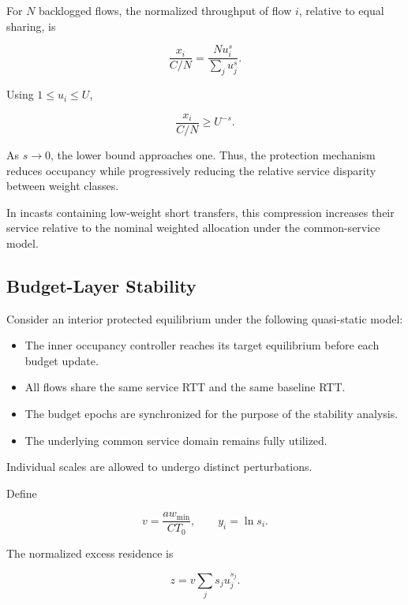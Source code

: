 For \(N\) backlogged flows, the normalized throughput of flow \(i\), relative to equal sharing, is

\begin{equation}
\label{eq:app-f-32}
\frac{x_i}{C/N}
=
\frac{Nu_i^s}{\sum_ju_j^s}.
\end{equation}

Using \(1\le u_i\le U\),

\begin{equation}
\label{eq:app-f-33}
\boxed{
\frac{x_i}{C/N}\ge U^{-s}.
}
\end{equation}

As \(s\to0\), the lower bound approaches one. Thus, the protection mechanism reduces occupancy while progressively reducing the relative service disparity between weight classes.

In incasts containing low-weight short transfers, this compression increases their service relative to the nominal weighted allocation under the common-service model.

\subsection{Budget-Layer Stability}
\label{app:f-5}

Consider an interior protected equilibrium under the following quasi-static model:

\begin{itemize}
\item The inner occupancy controller reaches its target equilibrium before each budget update.
\item All flows share the same service RTT and the same baseline RTT.
\item The budget epochs are synchronized for the purpose of the stability analysis.
\item The underlying common service domain remains fully utilized.
\end{itemize}

Individual scales are allowed to undergo distinct perturbations.

Define

\begin{equation}
\label{eq:app-f-34}
v=\frac{aw_{\min}}{CT_0},
\qquad
y_i=\ln s_i.
\end{equation}

The normalized excess residence is

\begin{equation}
\label{eq:app-f-35}
z=v\sum_j s_ju_j^{s_j}.
\end{equation}

